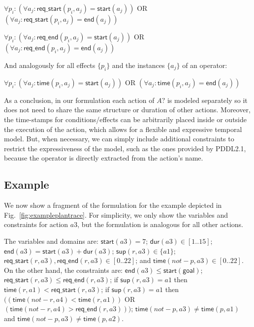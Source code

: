 \documentclass[10pt,journal,compsoc]{IEEEtran}
\newcommand{\dur}{\mathsf{dur}}    %
\newcommand{\start}{\mathsf{start}}%
\newcommand{\en}{\mathsf{end}}     %
\newcommand{\supp}{\mathsf{sup}}   %
\newcommand{\tim}{\mathsf{time}}   %
\newcommand{\reqs}{\mathsf{req\_{start}}} %
\newcommand{\reqe}{\mathsf{req\_{end}}}   %
\newcommand{\goal}{\mathsf{goal}}  %
\begin{document}
$\forall p_i: (\forall a_j: \reqs(p_i,a_j) = \start(a_j))$ OR $(\forall a_j: \reqs(p_i,a_j) = \en(a_j))$

$\forall p_i: (\forall a_j: \reqe(p_i,a_j) = \start(a_j))$ OR $(\forall a_j: \reqe(p_i,a_j) = \en(a_j))$

And analogously for all effects $\{p_i\}$ and the instances $\{a_j\}$ of an operator:

$\forall p_i: (\forall a_j: \tim(p_i,a_j) = \start(a_j))$ OR $(\forall a_j: \tim(p_i,a_j) = \en(a_j))$


As a conclusion, in our formulation each action of $A?$ is modeled separately so it does not need to share the same structure or duration of other actions. Moreover, the time-stamps for conditions/effects can be arbitrarily placed inside or outside the execution of the action, which allows for a flexible and expressive temporal model. But, when necessary, we can simply include additional constraints to restrict the expressiveness of the model, such as the ones provided by PDDL2.1, because the operator is directly extracted from the action's name.


\subsection{Example}
\label{sec:example}

We now show a fragment of the formulation for the example depicted in Fig.~\ref{fig:exampleplantrace}. For simplicity, we only show the variables and constraints for action $a3$, but the formulation is analogous for all other actions.

The variables and domains are: $\start(a3)=7$; $\dur(a3) \in [1..15]$; $\en(a3)=\start(a3)+\dur(a3)$; $\supp(r,a3) \in \{a1\}$; $\reqs(r,a3),\reqe(r,a3) \in [0..22]$; and $\tim(not-p,a3) \in [0..22]$.
On the other hand, the constraints are: $\en(a3) \leq \start(\goal)$; $\reqs(r,a3) \leq \reqe(r,a3)$; if $\supp(r,a3)=a1$ then $\tim(r,a1) < \reqs(r,a3)$; if $\supp(r,a3)=a1$ then $((\tim(not-r,a4) < \tim(r,a1))$ OR $(\tim(not-r,a4) > \reqe(r,a3)))$; $\tim(not-p,a3) \neq \tim(p,a1)$ and $\tim(not-p,a3) \neq \tim(p,a2)$.
\end{document}
